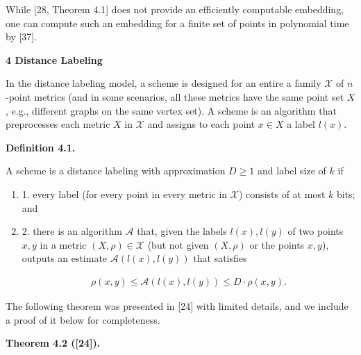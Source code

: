 \documentclass[10pt,a4paper]{amsart}
\begin{document}
While [28, Theorem 4.1] does not provide an efficiently computable embedding, one can compute such an embedding for a finite set of points in polynomial time by [37].
\par
\par
\par
\par
\par
\par\medskip\noindent\textbf{4 Distance Labeling}\par
In the distance labeling model, a scheme is designed for an entire a family $\mathcal{X}$ of $n$-point metrics (and in some scenarios, all these metrics have the same point set $X$, e.g., different graphs on the same vertex set). A scheme is an algorithm that preprocesses each metric $X$ in $\mathcal{X}$ and assigns to each point $x\in X$ a label $l(x)$.
\par
\par
\par\medskip\noindent\textbf{Definition 4.1.}\par
A scheme is a distance labeling with approximation $D\geq 1$ and label size of $k$ if
\par
\begin{enumerate}
\item  1. 
every label (for every point in every metric in $\mathcal{X}$) consists of at most $k$ bits; and
\par
\par
\item  2. 
there is an algorithm $\mathcal{A}$ that, given the labels $l(x),l(y)$ of two points $x,y$ in a metric $(X,\rho)\in\mathcal{X}$ (but not given $(X,\rho)$ or the points $x,y$), outputs an estimate $\mathcal{A}(l(x),l(y))$ that satisfies
\par
\[\begin{aligned}
\rho(x,y)\leq\mathcal{A}(l(x),l(y))\leq D\cdot\rho(x,y).
\end{aligned}\]
\par
\end{enumerate}
\par
\par
The following theorem was presented in [24] with limited details, and we include a proof of it below for completeness.
\par
\par
\par\medskip\noindent\textbf{Theorem 4.2 ([24]).}\par
\end{document}
